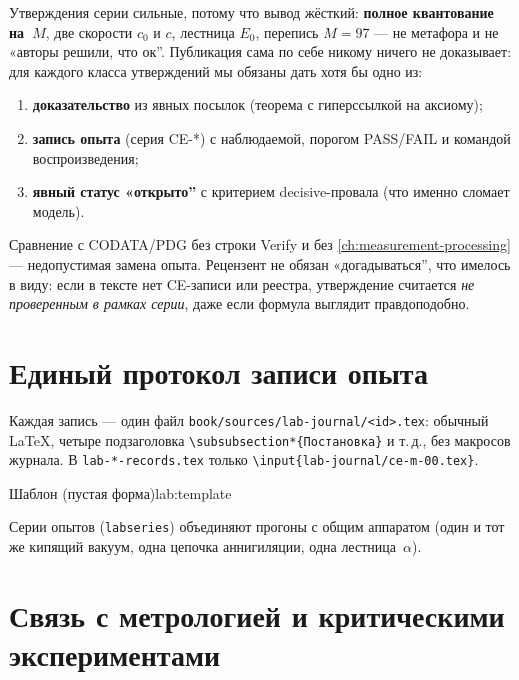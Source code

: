 Утверждения серии сильные, потому что вывод жёсткий: \textbf{полное квантование на~$M$},
две скорости $c_0$ и $c$, лестница $E_0$, перепись $M=97$ --- не метафора и не «авторы решили, что ок''.
Публикация сама по себе никому ничего не доказывает: для каждого класса утверждений мы обязаны дать
хотя бы одно из:
\begin{enumerate}[label=\textbf{B\arabic*:},leftmargin=*]
\item \textbf{доказательство} из явных посылок (теорема с гиперссылкой на аксиому);
\item \textbf{запись опыта} (серия CE-*) с наблюдаемой, порогом PASS/FAIL и командой воспроизведения;
\item \textbf{явный статус «открыто''} с критерием decisive-провала (что именно сломает модель).
\end{enumerate}
Сравнение с CODATA/PDG без строки Verify и без \cref{ch:measurement-processing} --- недопустимая
замена опыта.
Рецензент не обязан «догадываться'', что имелось в виду: если в тексте нет CE-записи или реестра,
утверждение считается \emph{не проверенным в рамках серии}, даже если формула выглядит правдоподобно.

\section{Единый протокол записи опыта}
\label{sec:lab-protocol}

Каждая запись --- один файл \texttt{book/sources/lab-journal/<id>.tex}: обычный \LaTeX{},
четыре подзаголовка \texttt{\textbackslash subsubsection*\{Постановка\}} и т.\,д., без макросов журнала.
В \texttt{lab-*-records.tex} только \texttt{\textbackslash input\{lab-journal/ce-m-00.tex\}}.

\begin{labrecord}{Шаблон (пустая форма)}{lab:template}

\end{labrecord}

Серии опытов (\texttt{labseries}) объединяют прогоны с общим аппаратом
(один и тот же кипящий вакуум, одна цепочка аннигиляции, одна лестница~$\alpha$).

\section{Связь с метрологией и критическими экспериментами}
\label{sec:lab-metrology-link}

